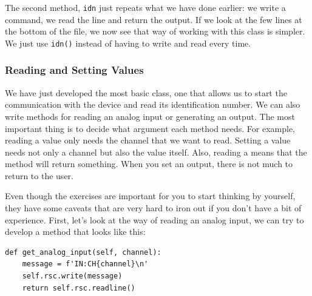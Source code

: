 The second method, \texttt{idn} just repeats what we have done earlier: we write a command, we read the line and return the output. If we look at the few lines at the bottom of the file, we now see that way of working with this class is simpler. We just use \texttt{idn()} instead of having to write and read every time.



\subsubsection{Reading and Setting Values}
We have just developed the most basic class, one that allows us to start the communication with the device and read its identification number. We can also write methods for reading an analog input or generating an output. The most important thing is to decide what argument each method needs. For example, reading a value only needs the channel that we want to read. Setting a value needs not only a channel but also the value itself. Also, reading a means that the method will return something. When you set an output, there is not much to return to the user.



Even though the exercises are important for you to start thinking by yourself, they have some caveats that are very hard to iron out if you don't have a bit of experience. First, let's look at the way of reading an analog input, we can try to develop a method that looks like this:

\begin{verbatim}
def get_analog_input(self, channel):
    message = f'IN:CH{channel}\n'
    self.rsc.write(message)
    return self.rsc.readline()
\end{verbatim}

